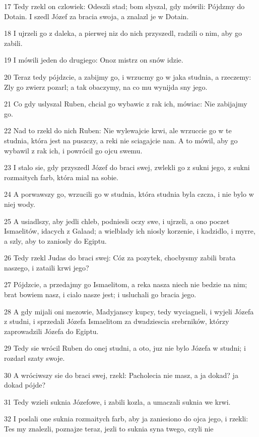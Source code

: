 \par 17 Tedy rzekl on czlowiek: Odeszli stad; bom slyszal, gdy mówili: Pójdzmy do Dotain. I szedl Józef za bracia swoja, a znalazl je w Dotain.
\par 18 I ujrzeli go z daleka, a pierwej niz do nich przyszedl, radzili o nim, aby go zabili.
\par 19 I mówili jeden do drugiego: Onoz mistrz on snów idzie.
\par 20 Teraz tedy pójdzcie, a zabijmy go, i wrzucmy go w jaka studnia, a rzeczemy: Zly go zwierz pozarl; a tak obaczymy, na co mu wynijda sny jego.
\par 21 Co gdy uslyszal Ruben, chcial go wybawic z rak ich, mówiac: Nie zabijajmy go.
\par 22 Nad to rzekl do nich Ruben: Nie wylewajcie krwi, ale wrzuccie go w te studnia, która jest na puszczy, a reki nie sciagajcie nan. A to mówil, aby go wybawil z rak ich, i powrócil go ojcu swemu.
\par 23 I stalo sie, gdy przyszedl Józef do braci swej, zwlekli go z sukni jego, z sukni rozmaitych farb, która mial na sobie.
\par 24 A porwawszy go, wrzucili go w studnia, która studnia byla czcza, i nie bylo w niej wody.
\par 25 A usiadlszy, aby jedli chleb, podniesli oczy swe, i ujrzeli, a ono poczet Ismaelitów, idacych z Galaad; a wielblady ich niosly korzenie, i kadzidlo, i myrre, a szly, aby to zaniosly do Egiptu.
\par 26 Tedy rzekl Judas do braci swej: Cóz za pozytek, chocbysmy zabili brata naszego, i zataili krwi jego?
\par 27 Pójdzcie, a przedajmy go Ismaelitom, a reka nasza niech nie bedzie na nim; brat bowiem nasz, i cialo nasze jest; i usluchali go bracia jego.
\par 28 A gdy mijali oni mezowie, Madyjanscy kupcy, tedy wyciagneli, i wyjeli Józefa z studni, i sprzedali Józefa Ismaelitom za dwadziescia srebrników, którzy zaprowadzili Józefa do Egiptu.
\par 29 Tedy sie wrócil Ruben do onej studni, a oto, juz nie bylo Józefa w studni; i rozdarl szaty swoje.
\par 30 A wróciwszy sie do braci swej, rzekl: Pacholecia nie masz, a ja dokad? ja dokad pójde?
\par 31 Tedy wzieli suknia Józefowe, i zabili kozla, a umaczali suknia we krwi.
\par 32 I poslali one suknia rozmaitych farb, aby ja zaniesiono do ojca jego, i rzekli: Tes my znalezli, poznajze teraz, jezli to suknia syna twego, czyli nie

